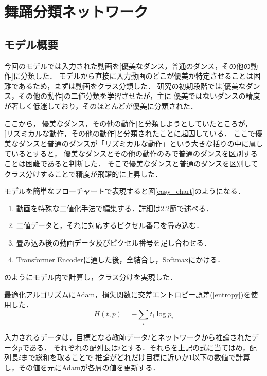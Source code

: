 \section{舞踊分類ネットワーク}

\subsection{モデル概要}
今回のモデルでは入力された動画を[優美なダンス，普通のダンス，その他の動作]に分類した．
モデルから直接に入力動画のどこが優美か特定させることは困難であるため，まずは動画をクラス分類した．
研究の初期段階では[優美なダンス，その他の動作]の二値分類を学習させたが，主に
優美ではないダンスの精度が著しく低迷しており，そのほとんどが優美に分類された．

ここから，[優美なダンス，その他の動作]と分類しようとしていたところが，
[リズミカルな動作，その他の動作]と分類されたことに起因している．
ここで優美なダンスと普通のダンスが「リズミカルな動作」という大きな括りの中に属しているとすると，
優美なダンスとその他の動作のみで普通のダンスを区別することは困難であると判断した．
そこで優美なダンスと普通のダンスを区別してクラス分けすることで精度が飛躍的に上昇した．

モデルを簡単なフローチャートで表現すると図\ref{easy_chart}のようになる．
\begin{enumerate}
  \item 動画を特殊な二値化手法で編集する．詳細は2.2節で述べる．
  \item 二値データと，それに対応するピクセル番号を畳み込む．
  \item 畳み込み後の動画データ及びピクセル番号を足し合わせる．
  \item Transformer Encoderに通した後，全結合し，Softmaxにかける．
\end{enumerate}
のようにモデル内で計算し，クラス分けを実現した．

最適化アルゴリズムにAdam\cite{adam}，損失関数に交差エントロピー誤差(\ref{entropy})を使用した．
\begin{equation}
  H(t, p) = -\sum_{i}t_i\log p_i
  \label{entropy}
\end{equation}

入力されるデータは，目標となる教師データ$t$とネットワークから推論されたデータ$p$である．
それぞれの配列長は$i$とする．それらを上記の式に当てはめ，配列長$i$まで総和を取ることで
推論がどれだけ目標に近いか1以下の数値で計算し，その値を元にAdamが各層の値を更新する．
\clearpage


